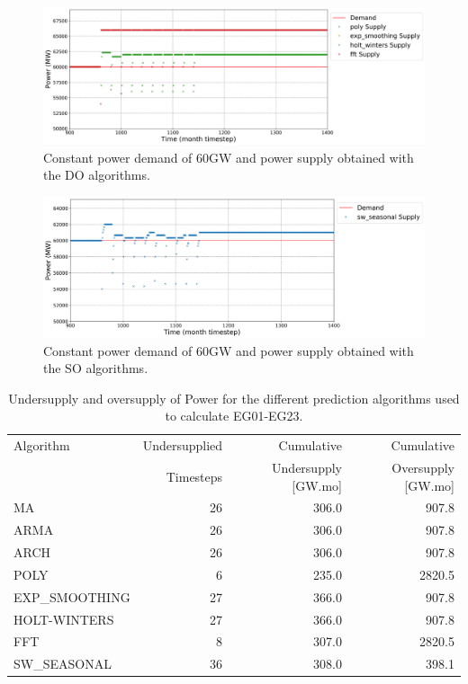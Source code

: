 \documentclass[11pt]{article}
\begin{document}
\begin{figure}[H]
	\centering
	\includegraphics[width=\textwidth]{23-figures/23-power0-buffer02.png} 
	\hfill
	\caption{Constant power demand of 60GW and power supply obtained with the DO algorithms.}
	\label{fig:23-DO}
\end{figure}

\begin{figure}[H]
	\centering
	\includegraphics[width=\textwidth]{23-figures/23-power0-buffer03.png} 
	\hfill
	\caption{Constant power demand of 60GW and power supply obtained with the SO algorithms.}
	\label{fig:23-SO}
\end{figure}

\begin{table}[H]
	\centering
	\caption{Undersupply and oversupply of Power for the different prediction algorithms used to calculate EG01-EG23.}
	\label{tab:23-power}
	\begin{tabularx}{\textwidth}{lRRR}
		\hline
		Algorithm & Undersupplied & Cumulative  & Cumulative \\
		& Timesteps     & Undersupply [GW.mo]  & Oversupply [GW.mo] \\ \hline
		MA        & 26 	& 306.0 &  907.8   \\ 
		ARMA      & 26 	& 306.0 &  907.8   \\ 
		ARCH      & 26 	& 306.0 &  907.8   \\ 
		POLY      &  6 	& 235.0 &  2820.5  \\ 
		EXP\_SMOOTHING 	& 27 & 366.0 & 907.8 \\ 
		HOLT-WINTERS  	& 27 & 366.0 & 907.8 \\ 
		FFT       & 8	& 307.0	& 2820.5 \\ 
		SW\_SEASONAL    & 36 & 308.0 & 398.1	\\ \hline
	\end{tabularx}
\end{table}
\end{document}
